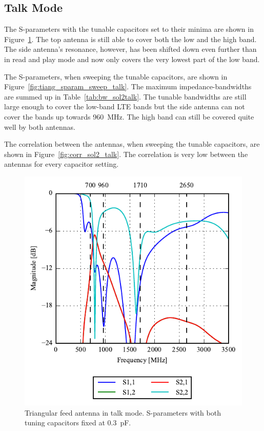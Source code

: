 \FloatBarrier
\subsection{Talk Mode}

The S-parameters with the tunable capacitors set to their minima are shown in Figure~\ref{fig:triang_sparam_talk}. The top antenna is still able to cover both the low and the high band. The side antenna's resonance, however, has been shifted down even further than in read and play mode and now only covers the very lowest part of the low band.

The S-parameters, when sweeping the tunable capacitors, are shown in Figure~\ref{fig:tiang_sparam_sweep_talk}. The maximum impedance-bandwidths are summed up in Table~\ref{tab:bw_sol2talk}. The tunable bandwidths are still large enough to cover the low-band LTE bands but the side antenna can not cover the bands up towards \SI{960}{MHz}. The high band can still be covered quite well by both antennas.

The correlation between the antennas, when sweeping the tunable capacitors, are shown in Figure~\ref{fig:corr_sol2_talk}. The correlation is very low between the antennas for every capacitor setting.


\begin{figure}[htbp]
    \centering
    \includegraphics{img/tech_sol/trianglefeed/talk_mode/sparams.pdf}
    \caption{Triangular feed antenna in talk mode. S-parameters with both tuning capacitors fixed at \SI{0.3}{pF}.}
    \label{fig:triang_sparam_talk}
\end{figure}


